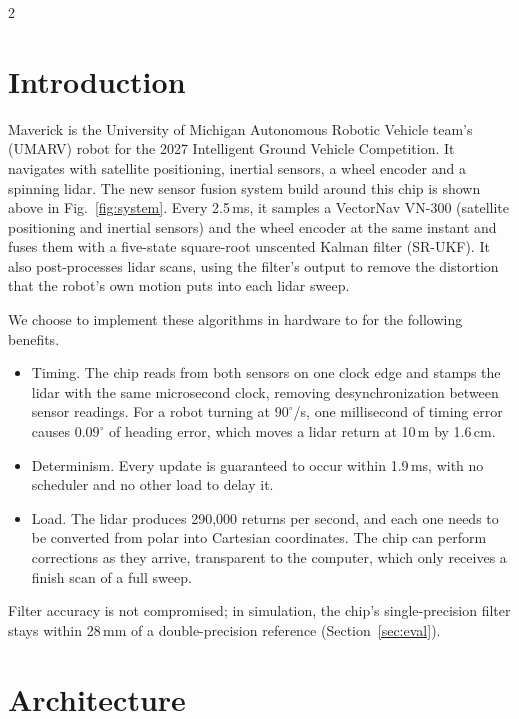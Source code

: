 \documentclass[10pt,letterpaper]{article}
\begin{document}
\vspace{2pt}
\begin{multicols}{2}

  \section{Introduction}

  Maverick is the University of Michigan Autonomous Robotic Vehicle team's (UMARV) robot for the 2027 Intelligent Ground Vehicle Competition.
  It navigates with satellite positioning, inertial sensors, a wheel encoder and a spinning lidar.
  The new sensor fusion system build around this chip is shown above in Fig.~\ref{fig:system}.
  Every 2.5\,ms, it samples a VectorNav VN-300 (satellite positioning and inertial sensors) and the wheel encoder at the same instant and fuses them with a five-state square-root unscented Kalman filter (SR-UKF).
  It also post-processes lidar scans, using the filter's output to remove the distortion that the robot's own motion puts into each lidar sweep.

  We choose to implement these algorithms in hardware to for the following benefits.
  \begin{itemize}
    \item Timing.
      The chip reads from both sensors on one clock edge and stamps the lidar with the same microsecond clock, removing desynchronization between sensor readings.
      For a robot turning at $90^\circ$/s, one millisecond of timing error causes $0.09^\circ$ of heading error, which moves a lidar return at 10\,m by 1.6\,cm.
    \item Determinism.
      Every update is guaranteed to occur within 1.9\,ms, with no scheduler and no other load to delay it.
    \item Load.
      The lidar produces 290,000 returns per second, and each one needs to be converted from polar into Cartesian coordinates.
      The chip can perform corrections as they arrive, transparent to the computer, which only receives a finish scan of a full sweep.
  \end{itemize}
  Filter accuracy is not compromised; in simulation, the chip's single-precision filter stays within 28\,mm of a double-precision reference (Section~\ref{sec:eval}).

  \section{Architecture}


\end{multicols}
\end{document}
